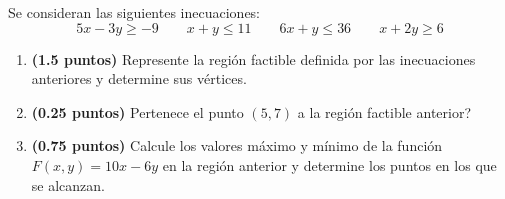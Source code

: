 
Se consideran las siguientes inecuaciones:
\[
5x-3y\geq -9\qquad x+y\leq 11\qquad 6x+y\leq 36\qquad x+2y\geq 6
\]
\begin{enumerate}[label=\alph*)]
  \item \textbf{(1.5 puntos)} Represente la región factible definida por las
  inecuaciones anteriores y determine sus vértices.
  \item \textbf{(0.25 puntos)} \textquestiondown{}Pertenece el punto $(5,7)$ a
  la región factible anterior?
  \item \textbf{(0.75 puntos)} Calcule los valores máximo y mínimo de la
  función $F(x,y)=10x-6y$ en la región anterior y determine los puntos en los
  que se alcanzan.
\end{enumerate}
